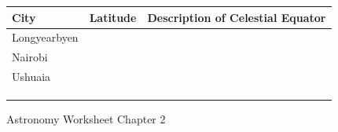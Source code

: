 \documentclass{article}
\newcounter{mycounter}
\begin{document}
\begin{center}
    \begin{tabular}{|p{2.5cm}|p{2cm}|p{10cm}|}
        \hline
        \textbf{City} & \textbf{Latitude} & \textbf{Description of Celestial Equator} \\
        \hline
        Longyearbyen & & \\[3em]
        \hline
        Nairobi & & \\[3em]
        \hline
        Ushuaia & & \\[3em]
        \hline
        & & \\[3em]
        \hline
        & & \\[3em]
        \hline
        & & \\[3em]
        \hline
    \end{tabular}
\end{center}

\clearpage

Astronomy \hfill Worksheet \themycounter \hfill Chapter 2
\vspace{1em}

\begin{center} 
\end{center}
\end{document}
